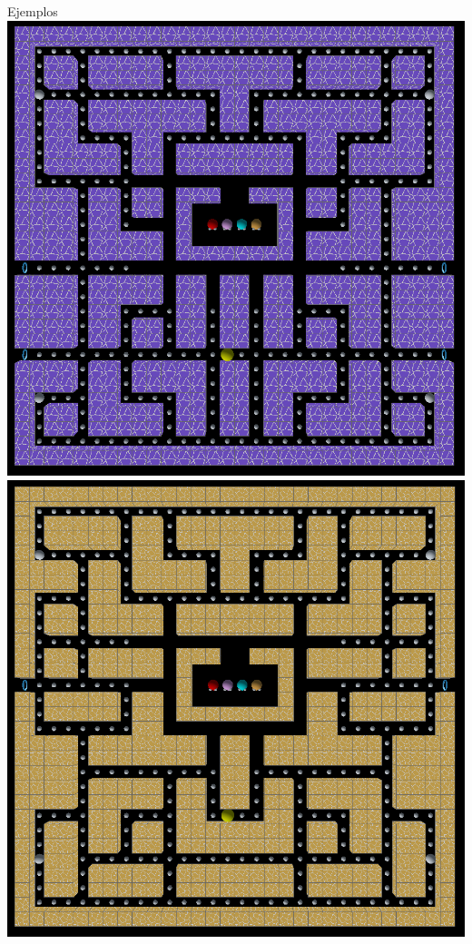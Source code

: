 \documentclass{beamer}
\begin{document}
    \begin{frame}{Ejemplos \scriptsize{\hfill \secname}}
        \centering
        \vspace{3mm}
        \includegraphics[scale=0.15]{img/laberinto3.png}
        \hspace{3mm}
        \includegraphics[scale=0.15]{img/laberinto4.png}
    \end{frame}
    
\end{document}
